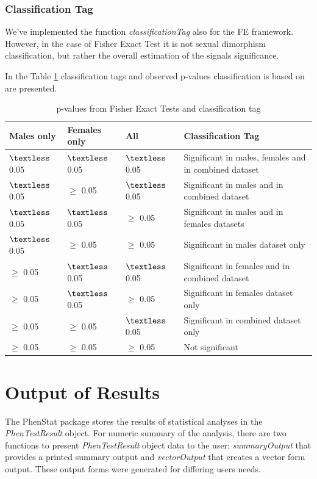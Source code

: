 \documentclass[12pt,a4paper]{article}
\begin{document}
\subsubsection{Classification Tag}
We've implemented the function \textit{classificationTag} also for the FE framework. 
However, in the case of Fisher Exact Test it is not sexual dimorphism classification, but rather the overall estimation of the signals significance.

In the Table \ref{table:04} classification tags and observed p-values classification is based on are presented.

\begin{table}[!h]
\begin{center}
\begin{tabular}{| l | l | l | l |}
  \hline
Males only&Females only&All&Classification Tag\\\hline
$\textless$ 0.05&$\textless$ 0.05 &$\textless$ 0.05&Significant in males, females and in combined dataset\\
$\textless$ 0.05&$\geq$ 0.05&$\textless$ 0.05&Significant in males and in combined dataset\\
$\textless$ 0.05&$\textless$ 0.05&$\geq$ 0.05&Significant in males and in females datasets\\
$\textless$ 0.05&$\geq$ 0.05&$\geq$ 0.05&Significant in males dataset only\\
$\geq$ 0.05&$\textless$ 0.05&$\textless$ 0.05&Significant in females and in combined dataset\\
$\geq$ 0.05&$\textless$ 0.05&$\geq$ 0.05&Significant in females dataset only\\
$\geq$ 0.05&$\geq$ 0.05&$\textless$ 0.05&Significant in combined dataset only\\
$\geq$ 0.05&$\geq$ 0.05&$\geq$ 0.05&Not significant\\

\hline  
\end{tabular}
\caption{p-values from Fisher Exact Tests and classification tag}\label{table:04}
\end{center}
\end{table}

\section{Output of Results}
\label{section:Results}
The PhenStat package stores the results of statistical analyses in the \textit{PhenTestResult} object.  
For numeric summary of the analysis, there are two functions to present \textit{PhenTestResult} object data to the user: 
\textit{summaryOutput} that provides a printed summary output and \textit{vectorOutput} that creates a vector form output. 
These output forms were generated for differing users needs. 
\end{document}
